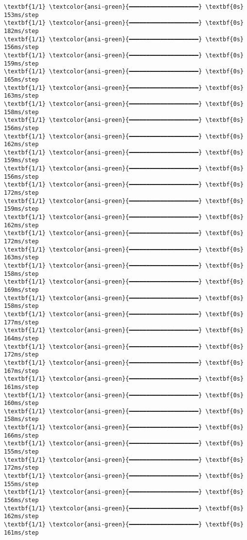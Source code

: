 \documentclass[11pt]{article}
\begin{document}
\begin{Verbatim}[commandchars=\\\{\}]
\textbf{1/1} \textcolor{ansi-green}{━━━━━━━━━━━━━━━━━━━━} \textbf{0s} 153ms/step
\textbf{1/1} \textcolor{ansi-green}{━━━━━━━━━━━━━━━━━━━━} \textbf{0s} 182ms/step
\textbf{1/1} \textcolor{ansi-green}{━━━━━━━━━━━━━━━━━━━━} \textbf{0s} 156ms/step
\textbf{1/1} \textcolor{ansi-green}{━━━━━━━━━━━━━━━━━━━━} \textbf{0s} 159ms/step
\textbf{1/1} \textcolor{ansi-green}{━━━━━━━━━━━━━━━━━━━━} \textbf{0s} 165ms/step
\textbf{1/1} \textcolor{ansi-green}{━━━━━━━━━━━━━━━━━━━━} \textbf{0s} 163ms/step
\textbf{1/1} \textcolor{ansi-green}{━━━━━━━━━━━━━━━━━━━━} \textbf{0s} 158ms/step
\textbf{1/1} \textcolor{ansi-green}{━━━━━━━━━━━━━━━━━━━━} \textbf{0s} 156ms/step
\textbf{1/1} \textcolor{ansi-green}{━━━━━━━━━━━━━━━━━━━━} \textbf{0s} 162ms/step
\textbf{1/1} \textcolor{ansi-green}{━━━━━━━━━━━━━━━━━━━━} \textbf{0s} 159ms/step
\textbf{1/1} \textcolor{ansi-green}{━━━━━━━━━━━━━━━━━━━━} \textbf{0s} 156ms/step
\textbf{1/1} \textcolor{ansi-green}{━━━━━━━━━━━━━━━━━━━━} \textbf{0s} 172ms/step
\textbf{1/1} \textcolor{ansi-green}{━━━━━━━━━━━━━━━━━━━━} \textbf{0s} 159ms/step
\textbf{1/1} \textcolor{ansi-green}{━━━━━━━━━━━━━━━━━━━━} \textbf{0s} 162ms/step
\textbf{1/1} \textcolor{ansi-green}{━━━━━━━━━━━━━━━━━━━━} \textbf{0s} 172ms/step
\textbf{1/1} \textcolor{ansi-green}{━━━━━━━━━━━━━━━━━━━━} \textbf{0s} 163ms/step
\textbf{1/1} \textcolor{ansi-green}{━━━━━━━━━━━━━━━━━━━━} \textbf{0s} 158ms/step
\textbf{1/1} \textcolor{ansi-green}{━━━━━━━━━━━━━━━━━━━━} \textbf{0s} 169ms/step
\textbf{1/1} \textcolor{ansi-green}{━━━━━━━━━━━━━━━━━━━━} \textbf{0s} 158ms/step
\textbf{1/1} \textcolor{ansi-green}{━━━━━━━━━━━━━━━━━━━━} \textbf{0s} 177ms/step
\textbf{1/1} \textcolor{ansi-green}{━━━━━━━━━━━━━━━━━━━━} \textbf{0s} 164ms/step
\textbf{1/1} \textcolor{ansi-green}{━━━━━━━━━━━━━━━━━━━━} \textbf{0s} 172ms/step
\textbf{1/1} \textcolor{ansi-green}{━━━━━━━━━━━━━━━━━━━━} \textbf{0s} 167ms/step
\textbf{1/1} \textcolor{ansi-green}{━━━━━━━━━━━━━━━━━━━━} \textbf{0s} 161ms/step
\textbf{1/1} \textcolor{ansi-green}{━━━━━━━━━━━━━━━━━━━━} \textbf{0s} 160ms/step
\textbf{1/1} \textcolor{ansi-green}{━━━━━━━━━━━━━━━━━━━━} \textbf{0s} 158ms/step
\textbf{1/1} \textcolor{ansi-green}{━━━━━━━━━━━━━━━━━━━━} \textbf{0s} 166ms/step
\textbf{1/1} \textcolor{ansi-green}{━━━━━━━━━━━━━━━━━━━━} \textbf{0s} 155ms/step
\textbf{1/1} \textcolor{ansi-green}{━━━━━━━━━━━━━━━━━━━━} \textbf{0s} 172ms/step
\textbf{1/1} \textcolor{ansi-green}{━━━━━━━━━━━━━━━━━━━━} \textbf{0s} 155ms/step
\textbf{1/1} \textcolor{ansi-green}{━━━━━━━━━━━━━━━━━━━━} \textbf{0s} 156ms/step
\textbf{1/1} \textcolor{ansi-green}{━━━━━━━━━━━━━━━━━━━━} \textbf{0s} 162ms/step
\textbf{1/1} \textcolor{ansi-green}{━━━━━━━━━━━━━━━━━━━━} \textbf{0s} 161ms/step

\end{Verbatim}
\end{document}
